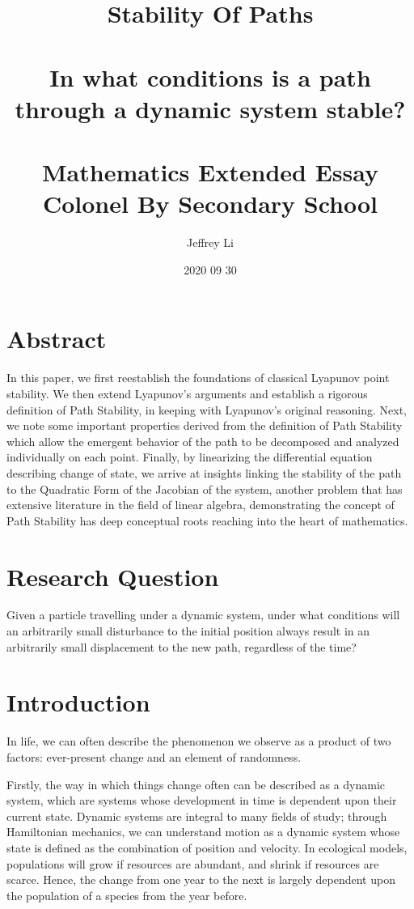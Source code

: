 \documentclass{article}
\title{
  {\LARGE
   \textbf{Stability Of Paths}
   }\\~\\
   {\large
    \textbf{In what conditions is a path through a dynamic system stable?}
   }\\~\\
  {\large Mathematics Extended Essay}\\
  {\large Colonel By Secondary School}
}
\author{Jeffrey Li}
\date{2020 09 30}
\theoremstyle{definition}
\theoremstyle{remark}
\begin{document}
\maketitle
\break

\section*{Abstract}
In this paper, we first reestablish the foundations of classical
Lyapunov point stability. We then extend Lyapunov's arguments
and establish a rigorous definition of Path Stability, in keeping 
with Lyapunov's original reasoning. Next, we note some important 
properties derived from the definition of Path Stability which 
allow the emergent behavior of the path to be decomposed and 
analyzed individually on each point. Finally, by linearizing
the differential equation describing change of state, we arrive at insights
linking the stability of the path to the Quadratic Form of
the Jacobian of the system, another problem that has extensive 
literature in the field of linear algebra, demonstrating
the concept of Path Stability has deep conceptual roots
reaching into the heart of mathematics.

\break

\tableofcontents
\break


\section{Research Question}
Given a particle travelling under a dynamic system, 
under what conditions will an arbitrarily small disturbance to the initial 
position always result in an arbitrarily small displacement to the new path,
regardless of the time? 

\section{Introduction}
In life, we can often describe the phenomenon we observe as a product of two factors:
ever-present change and an element of randomness.

Firstly, the way in which things change often can be described as a dynamic system,
which are systems whose development in time is dependent upon their current state. Dynamic systems are integral to 
many fields of study; through Hamiltonian mechanics, we can understand motion
as a dynamic system whose state is defined as the combination of position and velocity.
In ecological models, populations will grow if resources are abundant, and shrink if
resources are scarce. Hence, the change from one year to the next is largely dependent
upon the population of a species from the year before. 
\end{document}
